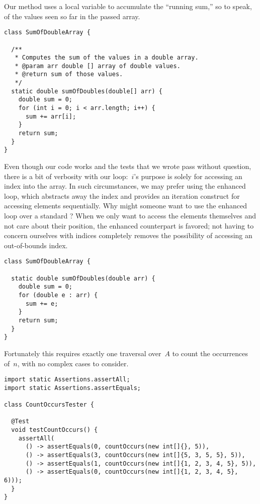 Our method uses a local variable to accumulate the ``running sum,'' so to speak, of the values seen so far in the passed array.

\begin{lstlisting}[language=MyJava]
class SumOfDoubleArray {

  /**
   * Computes the sum of the values in a double array.
   * @param arr double [] array of double values.
   * @return sum of those values.
   */
  static double sumOfDoubles(double[] arr) {
    double sum = 0;
    for (int i = 0; i < arr.length; i++) { 
      sum += arr[i]; 
    }
    return sum;
  }
}
\end{lstlisting}

Even though our code works and the tests that we wrote pass without question, there is a bit of verbosity with our loop:~$i$'s purpose is solely for accessing an index into the array. 
In such circumstances, we may prefer using the enhanced  loop, which abstracts away the index and provides an iteration construct for accessing elements sequentially.
Why might someone want to use the enhanced  loop over a standard ? 
When we only want to access the elements themselves and not care about their position, the enhanced counterpart is favored; not having to concern ourselves with indices completely removes the possibility of accessing an out-of-bounds index. 

\enlargethispage{2\baselineskip}
\begin{lstlisting}[language=MyJava]
class SumOfDoubleArray {

  static double sumOfDoubles(double arr) {
    double sum = 0;
    for (double e : arr) { 
      sum += e; 
    }
    return sum;
  }
}
\end{lstlisting}

Fortunately this requires exactly one traversal over~$A$ to count the occurrences of~$n$, with no complex cases to consider.

\begin{lstlisting}[language=MyJava]
import static Assertions.assertAll;
import static Assertions.assertEquals;

class CountOccursTester {

  @Test
  void testCountOccurs() {
    assertAll(
      () -> assertEquals(0, countOccurs(new int[]{}, 5)),
      () -> assertEquals(3, countOccurs(new int[]{5, 3, 5, 5}, 5)),
      () -> assertEquals(1, countOccurs(new int[]{1, 2, 3, 4, 5}, 5)),
      () -> assertEquals(0, countOccurs(new int[]{1, 2, 3, 4, 5}, 6)));
  }
}
\end{lstlisting}

